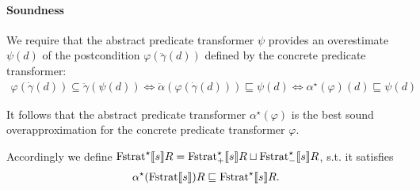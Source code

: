\documentclass{article}
\newcommand{\Term}{\ensuremath \mathbb{T}}
\newcommand{\Fail}{\ensuremath \mathbb{F}}
\newcommand{\Var}{\ensuremath \mathbb{V}}
\newcommand{\Env}{\ensuremath \Var \mapsto \Term}
\newcommand{\Pow}[1]{\ensuremath \mathcal{P}(#1)}
\newcommand{\Fstrat}[1]{\ensuremath \text{Fstrat}\llbracket #1 \rrbracket}
\newcommand{\Fstrata}[1]{\ensuremath \text{Fstrat}^\star\llbracket #1 \rrbracket}
\newcommand{\Fstratam}[1]{\ensuremath \text{Fstrat}^\star_{-}\llbracket #1 \rrbracket}
\newcommand{\Fstratap}[1]{\ensuremath \text{Fstrat}^\star_{+}\llbracket #1 \rrbracket}
\begin{document}
\begin{center}
\end{center}

\paragraph{Soundness}

We require that the abstract predicate transformer $\psi$ provides an overestimate $\psi(d)$ of the postcondition $\varphi(\ddot{\gamma}(d))$ defined by the concrete predicate transformer:
%
\begin{align*}
  \varphi(\dot{\gamma}(d)) \subseteq \ddot{\gamma}(\psi(d)) \Longleftrightarrow
  \ddot{\alpha}(\varphi(\dot{\gamma}(d))) \sqsubseteq \psi(d) \Longleftrightarrow
  \alpha^\star(\varphi)(d) \sqsubseteq \psi(d)
\end{align*}

It follows that the abstract predicate transformer $\alpha^\star(\varphi)$ is the best sound overapproximation for the concrete predicate transformer $\varphi$.

Accordingly we define $\Fstrata{s}R = \Fstratap{s}R \sqcup \Fstratam{s}R$, s.t. it satisfies
\begin{align*}
  \alpha^\star(\Fstrat{s})R \sqsubseteq \Fstrata{s}R.
\end{align*}
\end{document}
